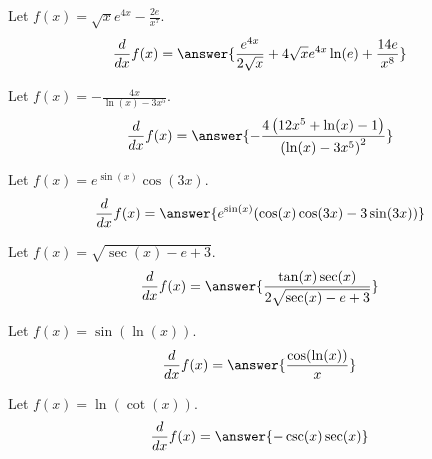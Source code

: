 \documentclass{ximera}
\begin{document}
\begin{shuffle}
\begin{exercise}
Let $f(x)=\sqrt{x} e^{4 x}-\frac{2 e}{x^7}$.
\[
\ddx f(x) = \answer{\frac{e^{4 x}}{2 \sqrt{x}}+4 \sqrt{x} e^{4 x} \ln (e)+\frac{14 e}{x^8}}
\]
\end{exercise}

\begin{exercise}
Let $f(x)=-\frac{4 x}{\ln (x)-3 x^5}$.
\[
\ddx f(x) = \answer{-\frac{4 \left(12 x^5+\ln (x)-1\right)}{\left(\ln (x)-3 x^5\right)^2}}
\]
\end{exercise}

\begin{exercise}
Let $f(x)=e^{\sin (x)} \cos (3 x)$.
\[
\ddx f(x) = \answer{e^{\sin (x)} (\cos (x) \cos (3 x)-3 \sin (3 x))}
\]
\end{exercise}

\begin{exercise}
Let $f(x)=\sqrt{\sec (x)-e+3}$.
\[
\ddx f(x) = \answer{\frac{\tan (x) \sec (x)}{2 \sqrt{\sec (x)-e+3}}}
\]
\end{exercise}

\begin{exercise}
Let $f(x)=\sin (\ln (x))$.
\[
\ddx f(x) = \answer{\frac{\cos (\ln (x))}{x}}
\]
\end{exercise}

\begin{exercise}
Let $f(x)=\ln (\cot (x))$.
\[
\ddx f(x) = \answer{-\csc (x) \sec (x)}
\]
\end{exercise}


  
\end{shuffle}
\end{document}
